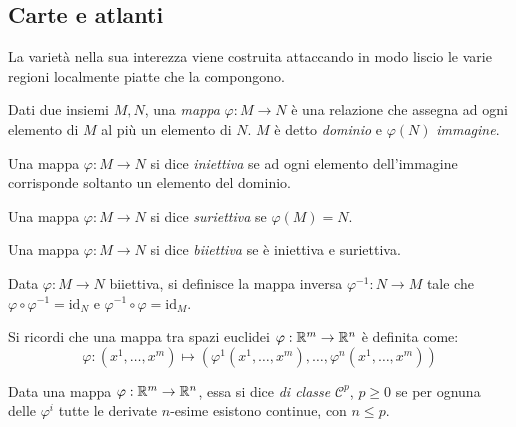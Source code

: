 \subsection{Carte e atlanti}

La varietà nella sua interezza viene costruita attaccando in modo liscio le varie regioni localmente piatte che la compongono.

\begin{definition}
	Dati due insiemi $ M,N $, una \textit{mappa} $ \varphi : M \rightarrow N $ è una relazione che assegna ad ogni elemento di $ M $ al più un elemento di $ N $. $ M $ è detto \textit{dominio} e $ \varphi(N) $ \textit{immagine}.
\end{definition}

\begin{definition}
	Una mappa $ \varphi : M \rightarrow N $ si dice \textit{iniettiva} se ad ogni elemento dell'immagine corrisponde soltanto un elemento del dominio.
\end{definition}

\begin{definition}
	Una mappa $ \varphi : M \rightarrow N $ si dice \textit{suriettiva} se $ \varphi(M) = N $.
\end{definition}

\begin{definition}
	Una mappa $ \varphi : M \rightarrow N $ si dice \textit{biiettiva} se è iniettiva e suriettiva.
\end{definition}

\begin{definition}
	Data $ \varphi : M \rightarrow N $ biiettiva, si definisce la mappa inversa $ \varphi^{-1} : N \rightarrow M $ tale che $ \varphi \circ \varphi^{-1} = \text{id}_N $ e $ \varphi^{-1} \circ \varphi = \text{id}_M $.
\end{definition}

Si ricordi che una mappa tra spazi euclidei $ \varphi : \mathbb{R}^m \rightarrow \mathbb{R}^n $ è definita come:
\begin{equation}
	\varphi : (x^1,\dots,x^m) \mapsto (\varphi^1(x^1,\dots,x^m),\dots,\varphi^n(x^1,\dots,x^m))
	\label{eq:6.1}
\end{equation}

\begin{definition}
	Data una mappa $ \varphi : \mathbb{R}^m \rightarrow \mathbb{R}^n $, essa si dice \textit{di classe} $ \mathcal{C}^p $, $ p \ge 0 $ se per ognuna delle $ \varphi^i $ tutte le derivate $ n $-esime esistono continue, con $ n \le p $.
\end{definition}

